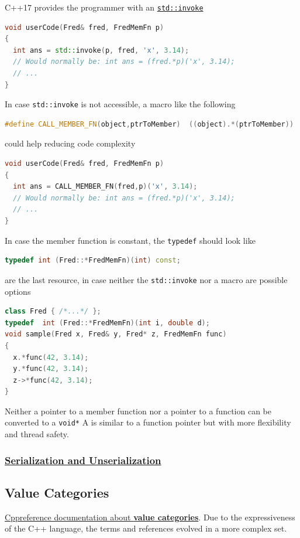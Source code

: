C++17 provides the programmer with an 
\href{https://en.cppreference.com/w/cpp/utility/functional/invoke}{\texttt{std::invoke}} 
\begin{lstlisting}[language=C++]
void userCode(Fred& fred, FredMemFn p)
{
  int ans = std::invoke(p, fred, 'x', 3.14);
  // Would normally be: int ans = (fred.*p)('x', 3.14);
  // ...
}
\end{lstlisting}
In case \texttt{std::invoke} is not accessible, a macro like the following
\begin{lstlisting}[language=C++]
#define CALL_MEMBER_FN(object,ptrToMember)  ((object).*(ptrToMember))
\end{lstlisting}
could help reducing code complexity
\begin{lstlisting}[language=C++]
void userCode(Fred& fred, FredMemFn p)
{
  int ans = CALL_MEMBER_FN(fred,p)('x', 3.14);
  // Would normally be: int ans = (fred.*p)('x', 3.14);
  // ...
}
\end{lstlisting}
In case the member function is constant, the \texttt{typedef} should look 
like
\begin{lstlisting}[language=C++]
typedef int (Fred::*FredMemFn)(int) const;
\end{lstlisting}
 
 are the last resource,
in case neither the \texttt{std::invoke} nor a macro are possible options
\begin{lstlisting}[language=C++]
class Fred { /*...*/ };
typedef  int (Fred::*FredMemFn)(int i, double d);
void sample(Fred x, Fred& y, Fred* z, FredMemFn func)
{
  x.*func(42, 3.14);
  y.*func(42, 3.14);
  z->*func(42, 3.14);
}    
\end{lstlisting}
Neither a pointer to a member function nor a pointer to a function can 
be converted to a \texttt{void*}
\newline
A  is similar to a function pointer but with 
more flexibility and thread safety.

\subsubsection{\href{https://isocpp.org/wiki/faq/serialization}{Serialization and Unserialization}}


\subsection{Value Categories}
\label{subsubsec:value-categories}
\href{https://en.cppreference.com/w/cpp/language/value_category}{Cppreference documentation about \textbf{value categories}}. 
\newline    
Due to the expressiveness of the C++ language, the terms  
and  references evolved in a more complex set.

